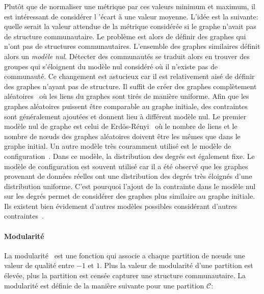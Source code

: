 Plutôt que de normaliser une métrique par ces valeurs minimum et maximum, il est intéressant de considérer l 'écart à une valeur moyenne.
L'idée est la suivante: quelle serait la valeur attendue de la métrique considérée si le graphe n'avait pas de structure communautaire.
Le problème est alors de définir des graphes qui n'ont pas de structures communautaires.
L'ensemble des graphes similaires définit alors un \emph{modèle nul}.
Détecter des communautés se traduit alors en trouver des groupes qui s'éloignent du modèle nul considéré où il n'existe pas de communauté.
Ce changement est astucieux car il est relativement aisé de définir des graphes n'ayant pas de structure.
Il suffit de créer des graphes complètement aléatoires~\cite{Erdos1959} où les liens du graphes sont tirés de manière uniforme.
Afin que les graphes aléatoires puissent être comparable au graphe initiale, des contraintes sont généralement ajoutées et donnent lieu à différent modèle nul.
Le premier modèle nul de graphe est celui de Erdös-Rényi~\cite{Erdos1959} où le nombre de liens et le nombre de n\oe uds des graphes aléatoires doivent être les mêmes que dans le graphe initial.
Un autre modèle très couramment utilisé est le modèle de configuration~\cite{Bender1978a}.
Dans ce modèle, la distribution des degrés est également fixe.
Le modèle de configuration est souvent utilisé car il a été observé que les graphes provenant de données réelles ont une distribution des degrés très éloignés d'une distribution uniforme.
C'est pourquoi l'ajout de la contrainte dans le modèle nul sur les degrés permet de considérer des graphes plus similaire au graphe initiale. 
Ils existent bien évidement d'autres modèles possibles considérant d'autres contraintes~\cite{Newman2009}.

\paragraph{Modularité}
La modularité~\cite{Newman2004} est une fonction qui associe a chaque partition de n\oe uds une valeur de qualité entre $-1$ et $1$.
Plus la valeur de modularité d'une partition est élevée, plus la partition est censée capturer une structure communautaire.
La modularité est définie de la manière suivante pour une partition $\mathcal{C}$:

